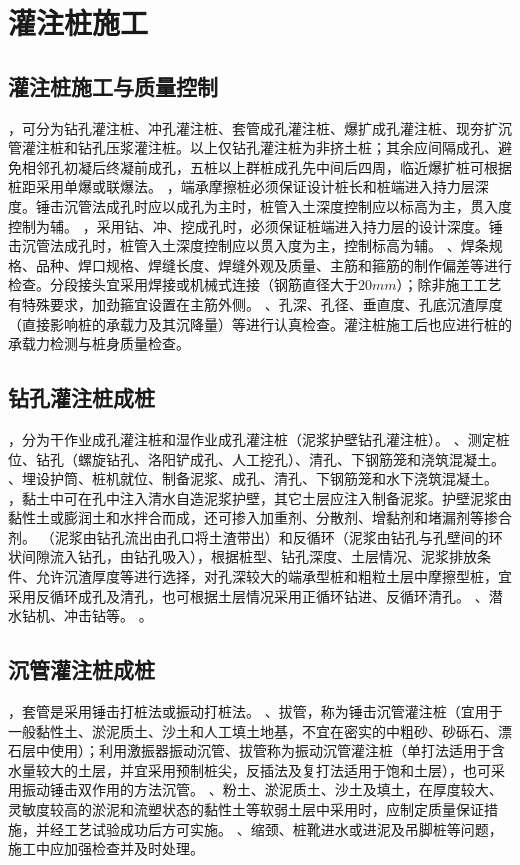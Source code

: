 \documentclass{book}
\begin{document}
\section{灌注桩施工}
\subsection{灌注桩施工与质量控制}
，可分为钻孔灌注桩、冲孔灌注桩、套管成孔灌注桩、爆扩成孔灌注桩、现夯扩沉管灌注桩和钻孔压浆灌注桩。以上仅钻孔灌注桩为非挤土桩；其余应间隔成孔、避免相邻孔初凝后终凝前成孔，五桩以上群桩成孔先中间后四周，临近爆扩桩可根据桩距采用单爆或联爆法。
，端承摩擦桩必须保证设计桩长和桩端进入持力层深度。锤击沉管法成孔时应以成孔为主时，桩管入土深度控制应以标高为主，贯入度控制为辅。
，采用钻、冲、挖成孔时，必须保证桩端进入持力层的设计深度。锤击沉管法成孔时，桩管入土深度控制应以贯入度为主，控制标高为辅。
、焊条规格、品种、焊口规格、焊缝长度、焊缝外观及质量、主筋和箍筋的制作偏差等进行检查。分段接头宜采用焊接或机械式连接（钢筋直径大于$20mm$）；除非施工工艺有特殊要求，加劲箍宜设置在主筋外侧。
、孔深、孔径、垂直度、孔底沉渣厚度（直接影响桩的承载力及其沉降量）等进行认真检查。灌注桩施工后也应进行桩的承载力检测与桩身质量检查。
\subsection{钻孔灌注桩成桩}
，分为干作业成孔灌注桩和湿作业成孔灌注桩（泥浆护壁钻孔灌注桩）。
、测定桩位、钻孔（螺旋钻孔、洛阳铲成孔、人工挖孔）、清孔、下钢筋笼和浇筑混凝土。
、埋设护筒、桩机就位、制备泥浆、成孔、清孔、下钢筋笼和水下浇筑混凝土。
，黏土中可在孔中注入清水自造泥浆护壁，其它土层应注入制备泥浆。护壁泥浆由黏性土或膨润土和水拌合而成，还可掺入加重剂、分散剂、增黏剂和堵漏剂等掺合剂。
（泥浆由钻孔流出由孔口将土渣带出）和反循环（泥浆由钻孔与孔壁间的环状间隙流入钻孔，由钻孔吸入），根据桩型、钻孔深度、土层情况、泥浆排放条件、允许沉渣厚度等进行选择，对孔深较大的端承型桩和粗粒土层中摩擦型桩，宜采用反循环成孔及清孔，也可根据土层情况采用正循环钻进、反循环清孔。
、潜水钻机、冲击钻等。
。
\subsection{沉管灌注桩成桩}
，套管是采用锤击打桩法或振动打桩法。
、拔管，称为锤击沉管灌注桩（宜用于一般黏性土、淤泥质土、沙土和人工填土地基，不宜在密实的中粗砂、砂砾石、漂石层中使用）；利用激振器振动沉管、拔管称为振动沉管灌注桩（单打法适用于含水量较大的土层，并宜采用预制桩尖，反插法及复打法适用于饱和土层），也可采用振动锤击双作用的方法沉管。
、粉土、淤泥质土、沙土及填土，在厚度较大、灵敏度较高的淤泥和流塑状态的黏性土等软弱土层中采用时，应制定质量保证措施，并经工艺试验成功后方可实施。
、缩颈、桩靴进水或进泥及吊脚桩等问题，施工中应加强检查并及时处理。
\end{document}
